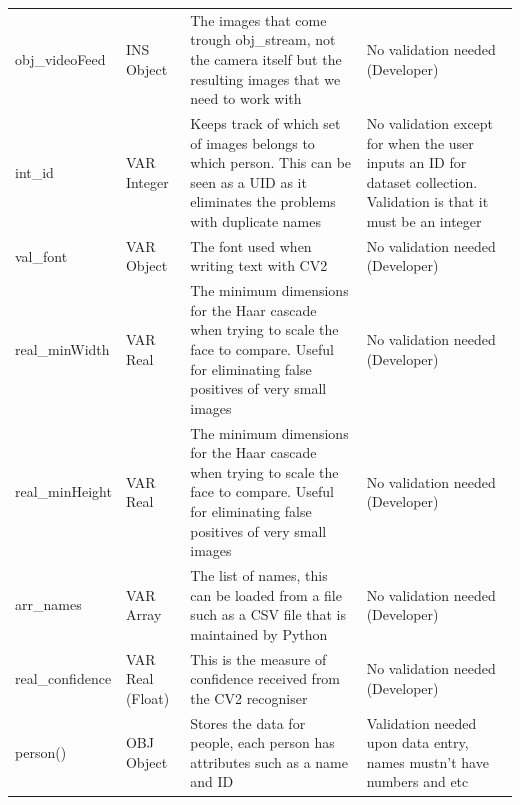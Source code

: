 \documentclass[9pt]{article}
\begin{document}
\begin{table}[H]
\begin{tabularx}{\textwidth}{llXX}
		obj\_videoFeed         & INS Object         & The images that come trough obj\_stream, not the camera itself but the resulting images that we need to work with                                 & No validation needed (Developer)                                                                                     \\
		int\_id                & VAR Integer        & Keeps track of which set of images belongs to which person. This can be seen as a UID as it eliminates the problems with duplicate names          & No validation except for when the user inputs an ID for dataset collection. Validation is that it must be an integer \\
		val\_font              & VAR Object         & The font used when writing text with CV2                                                                                                          & No validation needed (Developer)                                                                                     \\
		real\_minWidth         & VAR Real           & The minimum dimensions for the Haar cascade when trying to scale the face to compare. Useful for eliminating false positives of very small images & No validation needed (Developer)                                                                                     \\
		real\_minHeight        & VAR Real           & The minimum dimensions for the Haar cascade when trying to scale the face to compare. Useful for eliminating false positives of very small images & No validation needed (Developer)                                                                                     \\
		arr\_names             & VAR Array          & The list of names, this can be loaded from a file such as a CSV file that is maintained by Python                                                 & No validation needed (Developer)                                                                                     \\
		real\_confidence       & VAR Real (Float)   & This is the measure of confidence received from the CV2 recogniser                                                                                & No validation needed (Developer)                                                                                     \\
		person()                 & OBJ Object         & Stores the data for people, each person has attributes such as a name and ID                                                                      & Validation needed upon data entry, names mustn't have numbers and etc                                                \\[0.5cm]

\end{tabularx}
\end{table}
\end{document}
